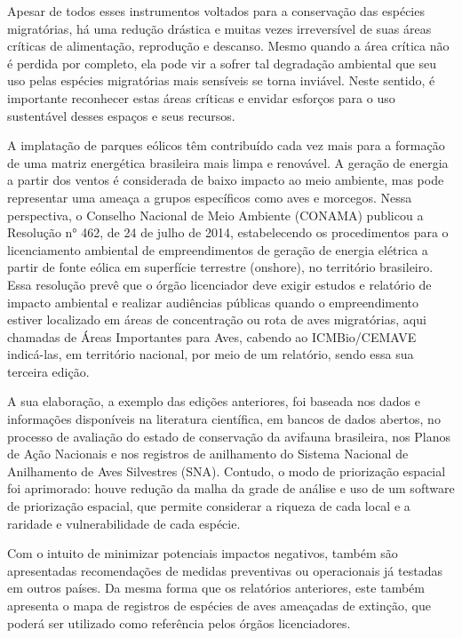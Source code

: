 \documentclass[
  oneside]{scrbook}
\begin{document}
Apesar de todos esses instrumentos voltados para a conservação das espécies migratórias, há uma redução drástica e muitas vezes irreversível de suas áreas críticas de alimentação, reprodução e descanso. Mesmo quando a área crítica não é perdida por completo, ela pode vir a sofrer tal degradação ambiental que seu uso pelas espécies migratórias mais sensíveis se torna inviável. Neste sentido, é importante reconhecer estas áreas críticas e envidar esforços para o uso sustentável desses espaços e seus recursos.

A implatação de parques eólicos têm contribuído cada vez mais para a formação de uma matriz energética brasileira mais limpa e renovável. A geração de energia a partir dos ventos é considerada de baixo impacto ao meio ambiente, mas pode representar uma ameaça a grupos específicos como aves e morcegos. Nessa perspectiva, o Conselho Nacional de Meio Ambiente (CONAMA) publicou a Resolução n° 462, de 24 de julho de 2014, estabelecendo os procedimentos para o licenciamento ambiental de empreendimentos de geração de energia elétrica a partir de fonte eólica em superfície terrestre (onshore), no território brasileiro. Essa resolução prevê que o órgão licenciador deve exigir estudos e relatório de impacto ambiental e realizar audiências públicas quando o empreendimento estiver localizado em áreas de concentração ou rota de aves migratórias, aqui chamadas de Áreas Importantes para Aves, cabendo ao ICMBio/CEMAVE indicá-las, em território nacional, por meio de um relatório, sendo essa sua terceira edição.

A sua elaboração, a exemplo das edições anteriores, foi baseada nos dados e informações disponíveis na literatura científica, em bancos de dados abertos, no processo de avaliação do estado de conservação da avifauna brasileira, nos Planos de Ação Nacionais e nos registros de anilhamento do Sistema Nacional de Anilhamento de Aves Silvestres (SNA). Contudo, o modo de priorização espacial foi aprimorado: houve redução da malha da grade de análise e uso de um software de priorização espacial, que permite considerar a riqueza de cada local e a raridade e vulnerabilidade de cada espécie.

Com o intuito de minimizar potenciais impactos negativos, também são apresentadas recomendações de medidas preventivas ou operacionais já testadas em outros países. Da mesma forma que os relatórios anteriores, este também apresenta o mapa de registros de espécies de aves ameaçadas de extinção, que poderá ser utilizado como referência pelos órgãos licenciadores.
\end{document}
